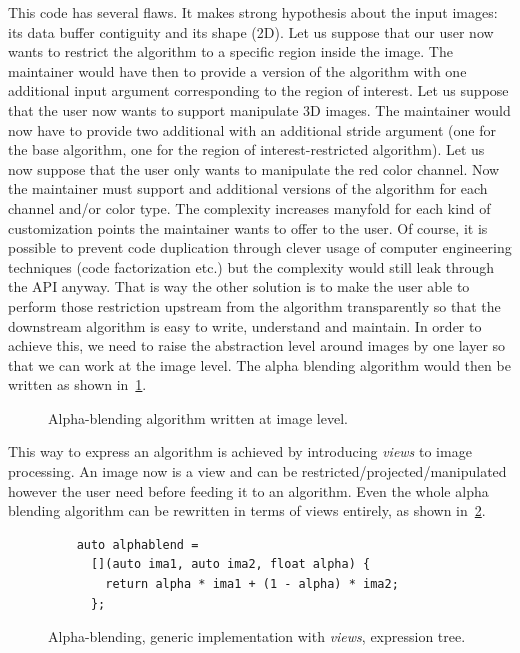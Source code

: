 This code has several flaws. It makes strong hypothesis about the input images: its data buffer contiguity and its shape
(2D). Let us suppose that our user now wants to restrict the algorithm to a specific region inside the image. The
maintainer would have then to provide a version of the algorithm with one additional input argument corresponding to the
region of interest. Let us suppose that the user now wants to support manipulate 3D images. The maintainer would now
have to provide two additional with an additional stride argument (one for the base algorithm, one for the region of
interest-restricted algorithm). Let us now suppose that the user only wants to manipulate the red color channel. Now the
maintainer must support and additional versions of the algorithm for each channel and/or color type. The complexity
increases manyfold for each kind of customization points the maintainer wants to offer to the user. Of course, it is
possible to prevent code duplication through clever usage of computer engineering techniques (code factorization etc.)
but the complexity would still leak through the API anyway. That is way the other solution is to make the user able to
perform those restriction upstream from the algorithm transparently so that the downstream algorithm is easy to write,
understand and maintain. In order to achieve this, we need to raise the abstraction level around images by one layer so
that we can work at the image level. The alpha blending algorithm would then be written as shown
in~\cref{fig.view.alphablend}.

\begin{figure}[htbp]
  \centering
  

  \caption{Alpha-blending algorithm written at image level.}
  \label{fig.view.alphablend}
\end{figure}

This way to express an algorithm is achieved by introducing \emph{views} to image processing. An image now is a view and
can be restricted/projected/manipulated however the user need before feeding it to an algorithm. Even the whole alpha
blending algorithm can be rewritten in terms of views entirely, as shown in~\cref{fig.new.alphablend}.

\begin{figure}[htbp]
  \centering
  \begin{minipage}[b]{5.5cm}
    
  \end{minipage}
  \begin{minipage}[b]{5.5cm}
    \begin{verbatim}
    auto alphablend =
      [](auto ima1, auto ima2, float alpha) {
        return alpha * ima1 + (1 - alpha) * ima2;
      };
    \end{verbatim}
    \bigskip
    \bigskip
    \bigskip
  \end{minipage}
  \caption{Alpha-blending, generic implementation with \emph{views}, expression tree.}
  \label{fig.new.alphablend}
\end{figure}

